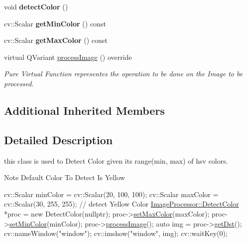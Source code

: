 \begin{DoxyCompactItemize}
void {\bfseries detect\+Color} ()
\item 
\mbox{\label{class_image_processor_1_1_detect_color_a77d3591d9e7e321d4c8a4d4d008efc79}} 
cv\+::\+Scalar {\bfseries get\+Min\+Color} () const
\item 
\mbox{\label{class_image_processor_1_1_detect_color_a41ba3da0db5e1725de15a3c0be822e9b}} 
cv\+::\+Scalar {\bfseries get\+Max\+Color} () const
\item 
virtual Q\+Variant \hyperlink{class_image_processor_1_1_detect_color_a7dc9d23817afafa44a9c022dff64b4a5}{process\+Image} () override
\begin{DoxyCompactList}\small\item\em Pure Virtual Function representes the operation to be done on the Image to be processed. \end{DoxyCompactList}\end{DoxyCompactItemize}
\subsection*{Additional Inherited Members}


\subsection{Detailed Description}
this class is used to Detect Color given it\textquotesingle{}s range(min, max) of hsv colors. 

\begin{DoxyNote}{Note}
Default Color To Detect Is Yellow
\end{DoxyNote}

\begin{DoxyCode}
  cv::Scalar minColor = cv::Scalar(20, 100, 100);
 cv::Scalar  maxColor = cv::Scalar(30, 255, 255); \textcolor{comment}{// detect Yellow Color}
 \hyperlink{class_image_processor_1_1_detect_color}{ImageProcessor::DetectColor} *proc = \textcolor{keyword}{new} DetectColor(\textcolor{keyword}{nullptr});
 proc->\hyperlink{class_image_processor_1_1_detect_color_a71bfe53fe223a7342e17e64adf483b84}{setMaxColor}(maxColor);
proc->\hyperlink{class_image_processor_1_1_detect_color_af9f1efdf1535b8a8516c3feb536fc8b8}{setMinColor}(minColor);
proc->\hyperlink{class_image_processor_1_1_detect_color_afb14622f8e1390f1cf887cc8bf1da568}{processImage}();
\textcolor{keyword}{auto} img = proc->\hyperlink{class_image_processor_1_1_abstract_image_processor_acbf98498ebece7b9f339222097a3429a}{getDst}();
cv::nameWindow(\textcolor{stringliteral}{"window"});
cv::imshow(\textcolor{stringliteral}{"window"}, img);
cv::waitKey(0);
\end{DoxyCode}
 

